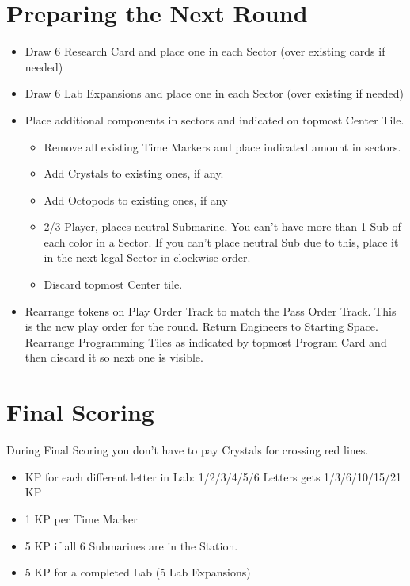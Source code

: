 \documentclass[12pt]{article}
\newenvironment{itemizeCustom}
{\begin{itemize}
  \setlength{\itemsep}{1pt}
  \setlength{\parskip}{0pt}
  \setlength{\parsep}{0pt}}
{\end{itemize}}
\begin{document}
\begin{multicols*}{2}
\section*{Preparing the Next Round}
\begin{itemizeCustom}
    \item Draw 6 Research Card and place one in each Sector (over existing cards if needed)
    \item Draw 6 Lab Expansions and place one in each Sector (over existing if needed)
    \item Place additional components in sectors and indicated on topmost Center Tile.
        \begin{itemizeCustom}
            \item Remove all existing Time Markers and place indicated amount in sectors.
            \item Add Crystals to existing ones, if any.
            \item Add Octopods to existing ones, if any
            \item 2/3 Player, places neutral Submarine. You can't have more than 1 Sub of each color in a Sector. If you can't place neutral Sub due to this, place it in the next legal Sector in clockwise order.
            \item Discard topmost Center tile.
        \end{itemizeCustom}
    \item Rearrange tokens on Play Order Track to match the Pass Order Track. This is the new play order for the round. Return Engineers to Starting Space. Rearrange Programming Tiles as indicated by topmost Program Card and then discard it so next one is visible.
\end{itemizeCustom}

\section*{Final Scoring}
During Final Scoring you don't have to pay Crystals for crossing red lines.

\begin{itemizeCustom}
    \item KP for each different letter in Lab: 1/2/3/4/5/6 Letters gets 1/3/6/10/15/21 KP
    \item 1 KP per Time Marker
    \item 5 KP if all 6 Submarines are in the Station.
    \item 5 KP for a completed Lab (5 Lab Expansions)
\end{itemizeCustom}

\end{multicols*}
\end{document}

